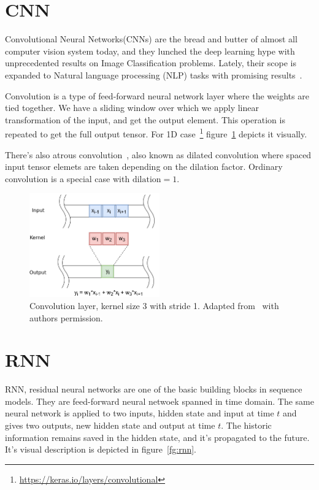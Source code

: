 \documentclass[times, utf8, diplomski, english]{fer}
\begin{document}
\section{CNN}
Convolutional Neural Networks(CNNs) are the bread and butter of almost all computer vision system today, and they lunched the deep learning hype with unprecedented results on Image Classification problems. 
Lately, their scope is expanded to Natural language processing (NLP) tasks with promising results~\citep{BYTENET, facebook}.

Convolution is a type of feed-forward neural network layer where the weights are tied together. We have a sliding window over which we apply linear transformation of the input, and get the output element. This operation is repeated to get the full output tensor. For 1D case~\footnote{\url{https://keras.io/layers/convolutional}} figure~\ref{fg:convolution} depicts it visually. 

There's also atrous convolution~\cite{atrous_DBLP:journals/corr/ChenPSA17}, also known as dilated convolution where spaced input tensor elemets are taken depending on the dilation factor. Ordinary convolution is a special case with $\text{dilation} = 1$.

\begin{figure}
	\begin{center}
		\includegraphics[width=0.5\textwidth]{convolution}
		\caption{Convolution layer, kernel size 3 with stride 1. Adapted from~\citep{mratkovic} with authors permission.}
		\label{fg:convolution}
	\end{center}
\end{figure}

\section{RNN}
RNN, residual neural networks are one of the basic building blocks in sequence models. They are feed-forward neural netwoek spanned in time domain. The same neural network is applied to two inputs, hidden state and input at time $t$ and gives two outputs, new hidden state and output at time $t$. The historic information remains saved in the hidden state, and it's propagated to the future. It's visual description is depicted in figure~\ref{fg:rnn}.
\end{document}
